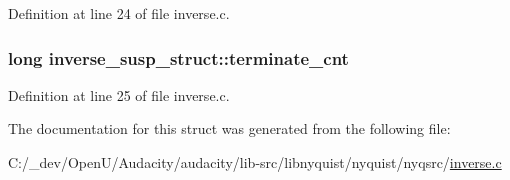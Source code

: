 Definition at line 24 of file inverse.\+c.

\subsubsection[{\texorpdfstring{terminate\+\_\+cnt}{terminate_cnt}}]{\setlength{\rightskip}{0pt plus 5cm}long inverse\+\_\+susp\+\_\+struct\+::terminate\+\_\+cnt}\hypertarget{structinverse__susp__struct_afae99e5ec29d78eef546540a92425900}{}\label{structinverse__susp__struct_afae99e5ec29d78eef546540a92425900}


Definition at line 25 of file inverse.\+c.



The documentation for this struct was generated from the following file\+:\begin{DoxyCompactItemize}
\item 
C\+:/\+\_\+dev/\+Open\+U/\+Audacity/audacity/lib-\/src/libnyquist/nyquist/nyqsrc/\hyperlink{inverse_8c}{inverse.\+c}\end{DoxyCompactItemize}
